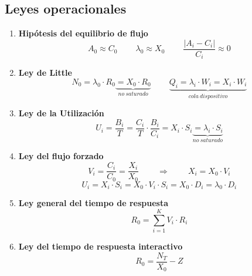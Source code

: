 \documentclass[10pt,spanish, landscape, twocolumn]{article}
\begin{document}
\subsection{Leyes operacionales}
\begin{enumerate}[$\bullet$]
    \item \textbf{Hipótesis del equilibrio de flujo}
    \begin{displaymath}
        A_0 \approx C_0 \qquad\ \lambda_0 \approx X_0 \qquad\ \frac{| A_i - C_i |}{C_i} \approx 0
    \end{displaymath}

    \item \textbf{Ley de Little}
    \begin{displaymath}
        N_0 = \lambda_0 \cdot R_0 \underbrace{= X_0 \cdot R_0}_{no ~ saturado} \qquad\ \underbrace{Q_i = \lambda_i \cdot W_i = X_i \cdot W_i}_{cola ~ dispositivo}
    \end{displaymath}

    \item \textbf{Ley de la Utilización}
    \begin{displaymath}
        U_i = \frac{B_i}{T} = \frac{C_i}{T} \cdot \frac{B_i}{C_i} = X_i \cdot S_i \underbrace{= \lambda_i \cdot S_i}_{no ~ saturado}
    \end{displaymath}

    \item \textbf{Ley del flujo forzado}
    \begin{displaymath}
        V_i = \frac{C_i}{C_0} = \frac{X_i}{X_0} \qquad\ \Longrightarrow \qquad\ X_i = X_0 \cdot V_i
    \end{displaymath}
    \begin{displaymath}
        U_i = X_i \cdot S_i = X_0 \cdot V_i \cdot S_i = X_0 \cdot D_i = \lambda_0 \cdot D_i
    \end{displaymath}

    \item \textbf{Ley general del tiempo de respuesta}
    \begin{displaymath}
        R_0 = \sum_{i=1}^K V_i \cdot R_i
    \end{displaymath}

    \item \textbf{Ley del tiempo de respuesta interactivo}
    \begin{displaymath}
        R_0 = \frac{N_T}{X_0} - Z
    \end{displaymath}
\end{enumerate}
\end{document}
